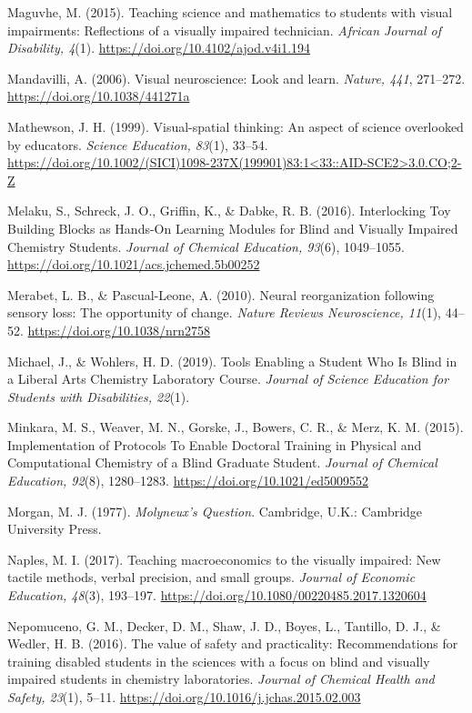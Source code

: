 \documentclass[11.5pt]{sig-alternate} %
\begin{document}
Maguvhe, M. (2015). Teaching science and mathematics to students with visual impairments: Reflections of a visually impaired technician. \textit{African Journal of Disability, 4}(1). \url{https://doi.org/10.4102/ajod.v4i1.194}

Mandavilli, A. (2006). Visual neuroscience: Look and learn. \textit{Nature, 441}, 271–272. \url{https://doi.org/10.1038/441271a}

Mathewson, J. H. (1999). Visual-spatial thinking: An aspect of science overlooked by educators. \textit{Science Education, 83}(1), 33–54. \url{https://doi.org/10.1002/(SICI)1098-237X(199901)83:1<33::AID-SCE2>3.0.CO;2-Z}

Melaku, S., Schreck, J. O., Griffin, K., \& Dabke, R. B. (2016). Interlocking Toy Building Blocks as Hands-On Learning Modules for Blind and Visually Impaired Chemistry Students. \textit{Journal of Chemical Education, 93}(6), 1049–1055. \url{https://doi.org/10.1021/acs.jchemed.5b00252}

Merabet, L. B., \& Pascual-Leone, A. (2010). Neural reorganization following sensory loss: The opportunity of change. \textit{Nature Reviews Neuroscience, 11}(1), 44–52. \url{https://doi.org/10.1038/nrn2758}

Michael, J., \& Wohlers, H. D. (2019). Tools Enabling a Student Who Is Blind in a Liberal Arts Chemistry Laboratory Course. \textit{Journal of Science Education for Students with Disabilities, 22}(1).

Minkara, M. S., Weaver, M. N., Gorske, J., Bowers, C. R., \& Merz, K. M. (2015). Implementation of Protocols To Enable Doctoral Training in Physical and Computational Chemistry of a Blind Graduate Student. \textit{Journal of Chemical Education, 92}(8), 1280–1283. \url{https://doi.org/10.1021/ed5009552}

Morgan, M. J. (1977). \textit{Molyneux’s Question}. Cambridge, U.K.: Cambridge University Press.

Naples, M. I. (2017). Teaching macroeconomics to the visually impaired: New tactile methods, verbal precision, and small groups. \textit{Journal of Economic Education, 48}(3), 193–197. \url{https://doi.org/10.1080/00220485.2017.1320604}

Nepomuceno, G. M., Decker, D. M., Shaw, J. D., Boyes, L., Tantillo, D. J., \& Wedler, H. B. (2016). The value of safety and practicality: Recommendations for training disabled students in the sciences with a focus on blind and visually impaired students in chemistry laboratories. \textit{Journal of Chemical Health and Safety, 23}(1), 5–11. \url{https://doi.org/10.1016/j.jchas.2015.02.003}
\end{document}
